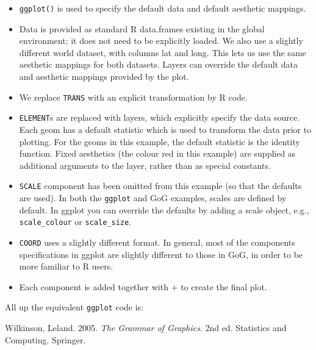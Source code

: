 \begin{itemize}
\itemsep1pt\parskip0pt
\item
  \texttt{ggplot()} is used to specify the default data and default
  aesthetic mappings.
\item
  Data is provided as standard R data.frames existing in the global
  environment; it does not need to be explicitly loaded. We also use a
  slightly different world dataset, with columns lat and long. This lets
  us use the same aesthetic mappings for both datasets. Layers can
  override the default data and aesthetic mappings provided by the plot.
\item
  We replace \texttt{TRANS} with an explicit transformation by R code.
\item
  \texttt{ELEMENT}s are replaced with layers, which explicitly specify
  the data source. Each geom has a default statistic which is used to
  transform the data prior to plotting. For the geoms in this example,
  the default statistic is the identity function. Fixed aesthetics (the
  colour red in this example) are supplied as additional arguments to
  the layer, rather than as special constants.
\item
  \texttt{SCALE} component has been omitted from this example (so that
  the defaults are used). In both the \texttt{ggplot} and GoG examples,
  scales are defined by default. In ggplot you can override the defaults
  by adding a scale object, e.g., \texttt{scale\_colour} or
  \texttt{scale\_size}.
\item
  \texttt{COORD} uses a slightly different format. In general, most of
  the components specifications in ggplot are slightly different to
  those in GoG, in order to be more familiar to R users.
\item
  Each component is added together with $+$ to create the final plot.
\end{itemize}

All up the equivalent \texttt{ggplot} code is:

\begin{Shaded}
\begin{Highlighting}[]
\StringTok{ }
   \StringTok{ }\NormalTok{))}

\StringTok{ }
\StringTok{  }\NormalTok{(} 
\StringTok{  }\NormalTok{(}\NormalTok{(}  \NormalTok{) +}
\StringTok{  }\NormalTok{(} \NormalTok{)}
\end{Highlighting}
\end{Shaded}

Wilkinson, Leland. 2005. \emph{The Grammar of Graphics}. 2nd ed.
Statistics and Computing. Springer.
